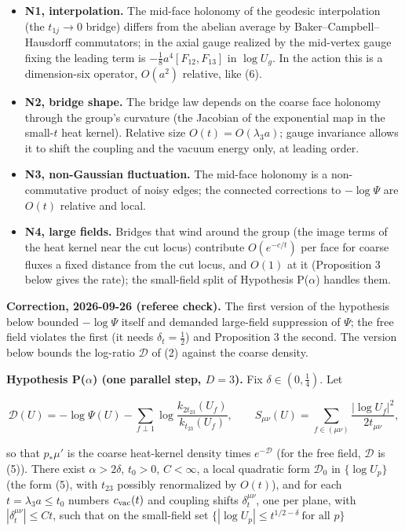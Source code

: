 \documentclass[11pt,a4paper]{article}
\newcommand{\tightlist}{\setlength{\itemsep}{0pt}\setlength{\parskip}{0pt}}
\begin{document}
\begin{itemize}
\tightlist
\item
  \textbf{N1, interpolation.} The mid-face holonomy of the geodesic
  interpolation (the \(t_{1j}\to0\) bridge) differs from the abelian
  average by Baker--Campbell--Hausdorff commutators; in the axial gauge
  realized by the mid-vertex gauge fixing the leading term is
  \(-\tfrac18a^4[F_{12},F_{13}]\) in \(\log U_g\). In the action this is
  a dimension-six operator, \(O(a^2)\) relative, like (6).
\item
  \textbf{N2, bridge shape.} The bridge law depends on the coarse face
  holonomy through the group's curvature (the Jacobian of the
  exponential map in the small-\(t\) heat kernel). Relative size
  \(O(t)=O(\lambda_3a)\); gauge invariance allows it to shift the
  coupling and the vacuum energy only, at leading order.
\item
  \textbf{N3, non-Gaussian fluctuation.} The mid-face holonomy is a
  non-commutative product of noisy edges; the connected corrections to
  \(-\log\Psi\) are \(O(t)\) relative and local.
\item
  \textbf{N4, large fields.} Bridges that wind around the group (the
  image terms of the heat kernel near the cut locus) contribute
  \(O(e^{-c/t})\) per face for coarse fluxes a fixed distance from the
  cut locus, and \(O(1)\) at it (Proposition 3 below gives the rate);
  the small-field split of Hypothesis P(\(\alpha\)) handles them.
\end{itemize}

\textbf{Correction, 2026-09-26 (referee check).} The first version of
the hypothesis below bounded \(-\log\Psi\) itself and demanded
large-field suppression of \(\Psi\); the free field violates the first
(it needs \(\delta_t=\frac12\)) and Proposition 3 the second. The
version below bounds the log-ratio \(\mathcal D\) of (2) against the
coarse density.

\textbf{Hypothesis P(\(\alpha\)) (one parallel step, \(D=3\)).} Fix
\(\delta\in(0,\frac14)\). Let

\[\mathcal D(U)=-\log\Psi(U)-\sum_{f\perp1}\log
\frac{k_{2t_{23}}(U_f)}{k_{t_{23}}(U_f)},\qquad
S_{\mu\nu}(U)=\sum_{f\in(\mu\nu)}\frac{|\log U_f|^2}{2t_{\mu\nu}},\]

so that \(p_*\mu'\) is the coarse heat-kernel density times
\(e^{-\mathcal D}\) (for the free field, \(\mathcal D\) is (5)). There
exist \(\alpha>2\delta\), \(t_0>0\), \(C<\infty\), a local quadratic
form \(\mathcal D_0\) in \(\{\log U_p\}\) (the form (5), with \(t_{23}\)
possibly renormalized by \(O(t)\)), and for each \(t=\lambda_3a\le t_0\)
numbers \(c_{\rm vac}(t)\) and coupling shifts \(\delta_t^{\mu\nu}\),
one per plane, with \(|\delta_t^{\mu\nu}|\le Ct\), such that on the
small-field set \(\{|\log U_p|\le t^{1/2-\delta}\ \text{for all }p\}\)
\end{document}
